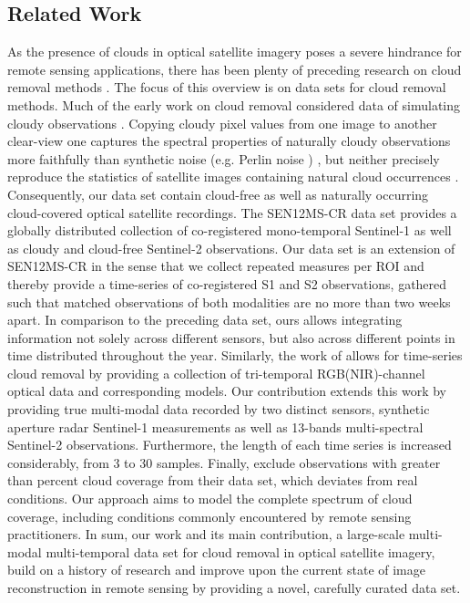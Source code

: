 \documentclass[journal]{IEEEtran}
\begin{document}
\subsection{Related Work} As the presence of clouds in optical satellite imagery poses a severe hindrance for remote sensing applications, there has been plenty of preceding research on cloud removal methods \cite{Enomoto_Sakurada_Wang_Fukui_Matsuoka_Nakamura_Kawaguchi_2017, Grohnfeldt_Schmitt_Zhu_2018, Singh_Komodakis_2018, sintarasirikulchai2018multi, Bermudez_Happ_Feitosa_Oliveira_2019, Rafique_Blanton_Jacobs, Sarukkai_Jain_Uzkent_Ermon_2019, meraner2020cloud, ebel2020multisensor}. The focus of this overview is on data sets for cloud removal methods. Much of the early work on cloud removal considered data of simulating cloudy observations \cite{Rafique_Blanton_Jacobs}. Copying cloudy pixel values from one image to another clear-view one \cite{Rafique_Blanton_Jacobs} captures the spectral properties of naturally cloudy observations more faithfully than synthetic noise (e.g. Perlin noise \cite{Perlin}) \cite{Enomoto_Sakurada_Wang_Fukui_Matsuoka_Nakamura_Kawaguchi_2017, Grohnfeldt_Schmitt_Zhu_2018, sintarasirikulchai2018multi}, but neither precisely reproduce the statistics of satellite images containing natural cloud occurrences \cite{ebel2020multisensor}. 
Consequently, our data set contain cloud-free as well as naturally occurring cloud-covered optical satellite recordings. The SEN12MS-CR data set \cite{ebel2020multisensor} provides a globally distributed collection of co-registered mono-temporal Sentinel-1 as well as cloudy and cloud-free Sentinel-2 observations. Our data set is an extension of SEN12MS-CR in the sense that we collect repeated measures per ROI and thereby provide a time-series of co-registered S1 and S2 observations, gathered such that matched observations of both modalities are no more than two weeks apart. In comparison to the preceding data set, ours allows integrating information not solely across different sensors, but also across different points in time distributed throughout the year. Similarly, the work of \cite{Sarukkai_Jain_Uzkent_Ermon_2019} allows for time-series cloud removal by providing a collection of tri-temporal RGB(NIR)-channel optical data and corresponding models. Our contribution extends this work by providing true multi-modal data recorded by two distinct sensors, synthetic aperture radar Sentinel-1 measurements as well as 13-bands multi-spectral Sentinel-2 observations. Furthermore, the length of each time series is increased considerably, from 3 to 30 samples. Finally, \cite{Sarukkai_Jain_Uzkent_Ermon_2019} exclude observations with greater than  percent cloud coverage from their data set, which deviates from real conditions. Our approach aims to model the complete spectrum of cloud coverage, including conditions commonly encountered by remote sensing practitioners. In sum, our work and its main contribution, a large-scale multi-modal multi-temporal data set for cloud removal in optical satellite imagery, build on a history of research and improve upon the current state of image reconstruction in remote sensing by providing a novel, carefully curated data set. 
\end{document}
